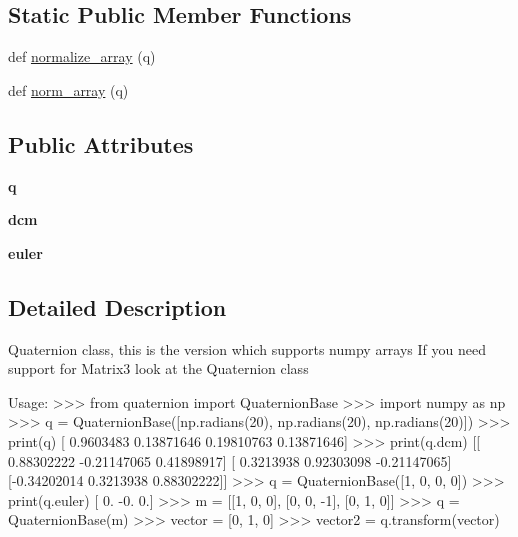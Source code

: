 \subsection*{Static Public Member Functions}
\begin{DoxyCompactItemize}
\item 
def \hyperlink{classpymavlink_1_1quaternion_1_1QuaternionBase_a074bda381cb981dcd546d196b94f0f65}{normalize\+\_\+array} (q)
\item 
def \hyperlink{classpymavlink_1_1quaternion_1_1QuaternionBase_a2de35cb9d1f25dabffe8706230ec2a8a}{norm\+\_\+array} (q)
\end{DoxyCompactItemize}
\subsection*{Public Attributes}
\begin{DoxyCompactItemize}
\item 
\mbox{\label{classpymavlink_1_1quaternion_1_1QuaternionBase_a392dcd8a214e33c00791e9fb655612b8}} 
{\bfseries q}
\item 
\mbox{\label{classpymavlink_1_1quaternion_1_1QuaternionBase_aaba200ee55a36ebaa3c8db02513a1cfe}} 
{\bfseries dcm}
\item 
\mbox{\label{classpymavlink_1_1quaternion_1_1QuaternionBase_a61484badb48116df5bafd66da24b3c02}} 
{\bfseries euler}
\end{DoxyCompactItemize}


\subsection{Detailed Description}
\begin{DoxyVerb}Quaternion class, this is the version which supports numpy arrays
If you need support for Matrix3 look at the Quaternion class

Usage:
    >>> from quaternion import QuaternionBase
    >>> import numpy as np
    >>> q = QuaternionBase([np.radians(20), np.radians(20), np.radians(20)])
    >>> print(q)
    [ 0.9603483   0.13871646  0.19810763  0.13871646]
    >>> print(q.dcm)
    [[ 0.88302222 -0.21147065  0.41898917]
     [ 0.3213938   0.92303098 -0.21147065]
     [-0.34202014  0.3213938   0.88302222]]
    >>> q = QuaternionBase([1, 0, 0, 0])
    >>> print(q.euler)
    [ 0. -0.  0.]
    >>> m = [[1, 0, 0], [0, 0, -1], [0, 1, 0]]
    >>> q = QuaternionBase(m)
    >>> vector = [0, 1, 0]
    >>> vector2 = q.transform(vector)
\end{DoxyVerb}
 

